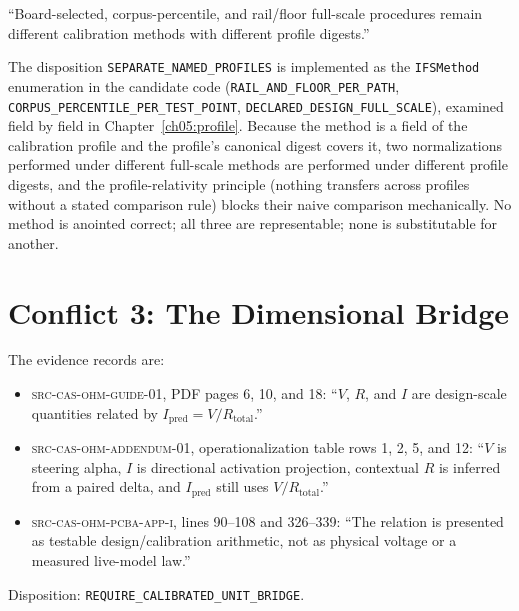 \begin{ruleenv}\label{ch04:rule:ifs}
``Board-selected, corpus-percentile, and rail/floor full-scale procedures
remain different calibration methods with different profile digests.''
\end{ruleenv}

The disposition \texttt{SEPARATE\_NAMED\_PROFILES} is implemented as the
\texttt{IFSMethod} enumeration in the candidate code
(\texttt{RAIL\_AND\_FLOOR\_PER\_PATH},
\texttt{CORPUS\_PERCENTILE\_PER\_TEST\_POINT},
\texttt{DECLARED\_DESIGN\_FULL\_SCALE}), examined field by field in
Chapter~\ref{ch05:profile}. Because the method is a field of the calibration
profile and the profile's canonical digest covers it, two normalizations
performed under different full-scale methods are performed under different
profile digests, and the profile-relativity principle (nothing transfers
across profiles without a stated comparison rule) blocks their naive
comparison mechanically. No method is anointed correct; all three are
representable; none is substitutable for another.

\section{Conflict 3: The Dimensional Bridge}\label{ch04:bridge}

\begin{conflict}\label{ch04:conf:bridge}
The evidence records are:
\begin{itemize}
\item \textsc{src-cas-ohm-guide-01}, PDF pages 6, 10, and 18: ``$V$, $R$, and
$I$ are design-scale quantities related by
$I_{\mathrm{pred}}=V/R_{\mathrm{total}}$.''
\item \textsc{src-cas-ohm-addendum-01}, operationalization table rows 1, 2,
5, and 12: ``$V$ is steering alpha, $I$ is directional activation projection,
contextual $R$ is inferred from a paired delta, and $I_{\mathrm{pred}}$ still
uses $V/R_{\mathrm{total}}$.''
\item \textsc{src-cas-ohm-pcba-app-i}, lines 90--108 and 326--339: ``The
relation is presented as testable design/calibration arithmetic, not as
physical voltage or a measured live-model law.''
\end{itemize}
Disposition: \texttt{REQUIRE\_CALIBRATED\_UNIT\_BRIDGE}.
\end{conflict}

